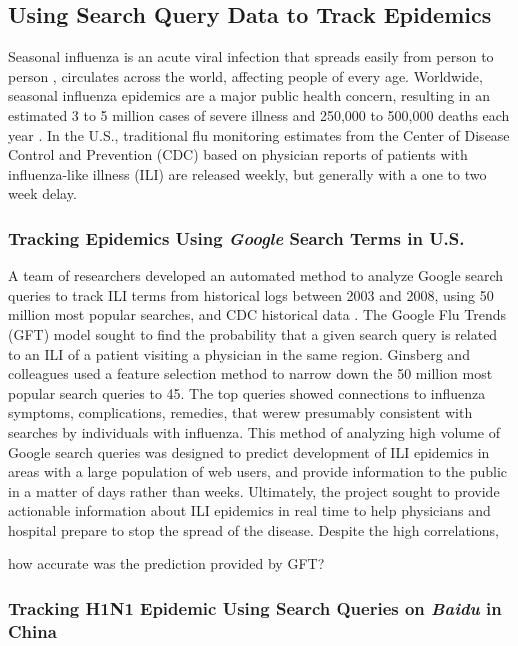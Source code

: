 \documentclass[sigconf]{acmart}
\begin{document}
\subsection{Using Search Query Data to Track Epidemics}

Seasonal influenza is an acute viral infection that spreads easily from person 
to person , circulates across the world, affecting people of every age. Worldwide, 
seasonal influenza epidemics are a major public health concern, resulting in an 
estimated 3 to 5 million cases of severe illness and 250,000 to 500,000 deaths 
each year \cite{who16}. In the U.S., traditional flu monitoring estimates from
the Center of Disease Control and Prevention (CDC) based on physician reports of
patients with influenza-like illness (ILI) are released weekly, but generally with 
a one to two week delay.

\subsubsection{Tracking Epidemics Using {\itshape Google} Search Terms in U.S.}

A team of researchers developed an automated method to analyze Google search 
queries to track ILI terms from historical logs between 2003 and 2008, using 50 
million most popular searches, and CDC historical data \cite{ginsberg09}. The 
Google Flu Trends (GFT) model sought to find the probability that a given search 
query is related to an ILI of a patient visiting a physician in the same region. 
Ginsberg and colleagues used a feature selection method to narrow down the 50 
million most popular search queries to 45. The top queries showed connections to 
influenza symptoms, complications, remedies, that werew presumably consistent with 
searches by individuals with influenza. This method of analyzing high volume of 
Google search queries was designed to predict development of ILI epidemics in 
areas with a large population of web users, and provide information to the public 
in a matter of days rather than weeks. Ultimately, the project sought to provide 
actionable information about ILI epidemics in real time to help physicians and 
hospital prepare to stop the spread of the disease. Despite the high correlations, 

how accurate was the prediction provided by GFT?




\subsubsection{Tracking H1N1 Epidemic Using Search Queries on {\itshape Baidu} in China }
\end{document}
